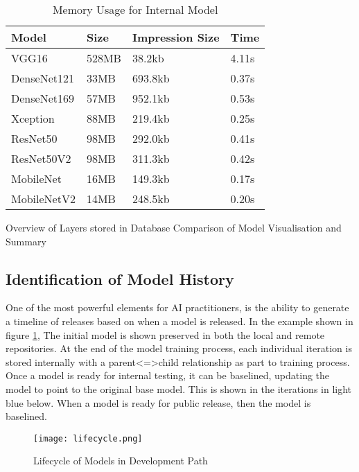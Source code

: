 \begin{table}[!ht]
    \centering
    \caption{Memory Usage for Internal Model}
    \label{table:memory}
    \setlength\tabcolsep{0pt} %
    \begin{tabular}{@{} p{2cm} p{2cm} p{2cm} p{1cm}  @{}}
        \hline
        Model & Size & Impression Size & Time\\
        \hline
        VGG16       & 528MB & 38.2kb & 4.11s \\
        DenseNet121	& 33MB & 693.8kb & 0.37s \\
        DenseNet169	& 57MB & 952.1kb & 0.53s \\
        Xception	& 88MB & 219.4kb & 0.25s \\
        ResNet50	& 98MB & 292.0kb & 0.41s \\
        ResNet50V2	& 98MB & 311.3kb & 0.42s \\
        MobileNet	& 16MB & 149.3kb & 0.17s \\
        MobileNetV2	& 14MB & 248.5kb & 0.20s \\
        \hline
    \end{tabular}
\end{table}

    Overview of Layers stored in Database
    Comparison of Model Visualisation and Summary

\subsection{Identification of Model History}

One of the most powerful elements for AI practitioners, is the ability to generate a timeline of releases based on when a model is released. In the example shown in figure \ref{fig:lifecycle_in real}, The initial model is shown preserved in both the local and remote repositories. At the end of the model training process, each individual iteration is stored internally with a parent<=>child relationship as part to training process. Once a model is ready for internal testing, it can be baselined, updating the model to point to the original base model. This is shown in the iterations in light blue below. When a model is ready for public release, then the model is baselined.

\begin{figure}[!t]
    \centering
    \texttt{[image: lifecycle.png]}
    \caption{Lifecycle of Models in Development Path}
    \label{fig:lifecycle_in real}
\end{figure}

